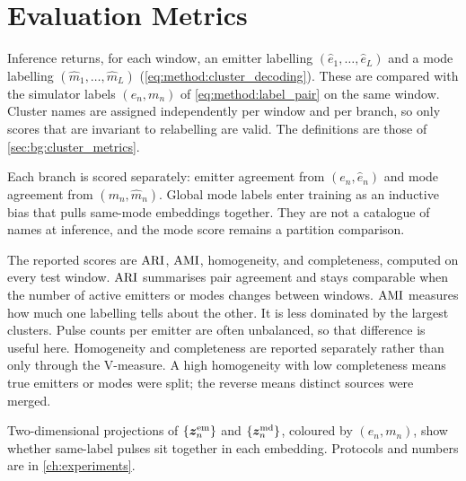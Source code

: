 \section{Evaluation Metrics}\label{sec:method:metrics}

Inference returns, for each window, an emitter labelling $(\hat{e}_1,\ldots,\hat{e}_L)$ and a mode labelling $(\hat{m}_1,\ldots,\hat{m}_L)$ (\cref{eq:method:cluster_decoding}).
These are compared with the simulator labels $(e_n,m_n)$ of \cref{eq:method:label_pair} on the same window.
Cluster names are assigned independently per window and per branch, so only scores that are invariant to relabelling are valid.
The definitions are those of \cref{sec:bg:cluster_metrics}.

Each branch is scored separately: emitter agreement from $(e_n,\hat{e}_n)$ and mode agreement from $(m_n,\hat{m}_n)$.
Global mode labels enter training as an inductive bias that pulls same-mode embeddings together.
They are not a catalogue of names at inference, and the mode score remains a partition comparison.

The reported scores are $\mathrm{ARI}$, $\mathrm{AMI}$, homogeneity, and completeness, computed on every test window.
$\mathrm{ARI}$ summarises pair agreement and stays comparable when the number of active emitters or modes changes between windows.
$\mathrm{AMI}$ measures how much one labelling tells about the other.
It is less dominated by the largest clusters.
Pulse counts per emitter are often unbalanced, so that difference is useful here.
Homogeneity and completeness are reported separately rather than only through the V-measure.
A high homogeneity with low completeness means true emitters or modes were split; the reverse means distinct sources were merged.

Two-dimensional projections of $\{\bm{z}^{\mathrm{em}}_n\}$ and $\{\bm{z}^{\mathrm{md}}_n\}$, coloured by $(e_n,m_n)$, show whether same-label pulses sit together in each embedding.
Protocols and numbers are in \cref{ch:experiments}.
